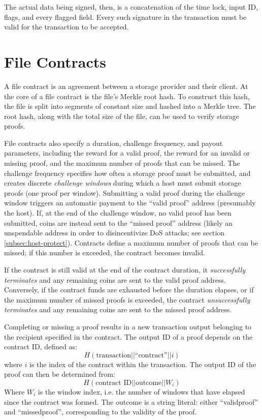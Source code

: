 \documentclass[twocolumn]{article}
\begin{document}
The actual data being signed, then, is a concatenation of the time lock, input ID, flags, and every flagged field.
Every such signature in the transaction must be valid for the transaction to be accepted.

\section{File Contracts}
\label{sec:contracts}
A file contract is an agreement between a storage provider and their client.
At the core of a file contract is the file's Merkle root hash.
To construct this hash, the file is split into segments of constant size and hashed into a Merkle tree.
The root hash, along with the total size of the file, can be used to verify storage proofs.

File contracts also specify a duration, challenge frequency, and payout parameters, including the reward for a valid proof, the reward for an invalid or missing proof, and the maximum number of proofs that can be missed.
The challenge frequency specifies how often a storage proof must be submitted, and creates discrete \textit{challenge windows} during which a host must submit storage proofs (one proof per window).
Submitting a valid proof during the challenge window triggers an automatic payment to the ``valid proof'' address (presumably the host).
If, at the end of the challenge window, no valid proof has been submitted, coins are instead sent to the ``missed proof'' address
(likely an unspendable address in order to disincentivize DoS attacks; see section \ref{subsec:host-protect}).
Contracts define a maximum number of proofs that can be missed; if this number is exceeded, the contract becomes invalid.

If the contract is still valid at the end of the contract duration, it \textit{successfully terminates} and any remaining coins are sent to the valid proof address.
Conversely, if the contract funds are exhausted before the duration elapses, or if the maximum number of missed proofs is exceeded, the contract \textit{unsuccessfully terminates} and any remaining coins are sent to the missed proof address.

Completing or missing a proof results in a new transaction output belonging to the recipient specified in the contract.
The output ID of a proof depends on the contract ID, defined as:
\[
	H(\text{transaction} || \text{``contract''} || i)
\]
where $i$ is the index of the contract within the transaction.
The output ID of the proof can then be determined from:
\[
	H(\text{contract ID} || \text{outcome} || W_i)
\]
Where $W_i$ is the window index, i.e. the number of windows that have elapsed since the contract was formed.
The outcome is a string literal: either ``validproof'' and ``missedproof'', corresponding to the validity of the proof.
\end{document}
